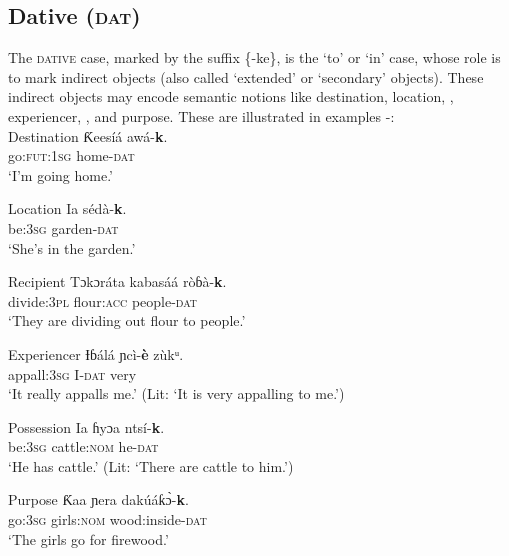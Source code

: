 \subsection{Dative (\textsc{dat})}\label{sec:7.4}


The \textsc{dative} case, marked by the suffix \{-ke\}, is the ‘to’ or ‘in’ case, whose role is to mark indirect objects (also called ‘extended’ or ‘secondary’ objects). These indirect objects may encode semantic notions like destination, location, , experiencer, , and purpose. These are illustrated in examples -:\\




Destination
\ea\label{ex:case:16}
\gll Ƙeesíá   awá-\textbf{k\ᵉ}. \\
go:\textsc{fut:1sg}   home-\textsc{dat}    \\
\glt ‘I’m going home.’ 
\z




Location
\ea\label{ex:case:17}
\gll Ia     sédà-\textbf{k\ᵉ}. \\
be:\textsc{3sg}   garden-\textsc{dat}    \\
\glt ‘She’s in the garden.’ 
\z


Recipient
\ea\label{ex:case:18}
\gll Tɔkɔráta   kabasáá   ròɓà-\textbf{k\ᵉ}. \\
divide:\textsc{3pl}   flour:\textsc{acc}   people-\textsc{dat}    \\
\glt ‘They are dividing out flour to people.’ 
\z




Experiencer
\ea\label{ex:case:19}
\gll Ɨɓálá     ɲcì-\textbf{è}   zùkᵘ. \\
appall:\textsc{3sg}   I-\textsc{dat}   very    \\
\glt ‘It really appalls me.’ (Lit: ‘It is very appalling to me.’) 
\z




Possession
\ea\label{ex:case:20}
\gll Ia     ɦyɔa     ntsí-\textbf{k\ᵉ}. \\
be:\textsc{3sg}   cattle:\textsc{nom}    he-\textsc{dat}    \\
\glt ‘He has cattle.’ (Lit: ‘There are cattle to him.’) 
\z



\newpage 

Purpose
\ea\label{ex:case:21}
\gll Ƙaa     ɲera     dakúáƙ\`{ɔ}-\textbf{k\ᵋ}. \\
go:\textsc{3sg}   girls:\textsc{nom}   wood:inside-\textsc{dat}    \\
\glt ‘The girls go for firewood.’ 
\z






